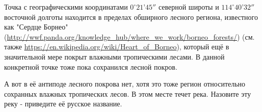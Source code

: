 
Точка с географическими координатами $0^{\circ}21’45''$ северной широты и $114^{\circ}40’32''$ 
восточной долготы находится в пределах обширного лесного региона, известного как "Сердце Борнео" (\url{http://wwf.panda.org/knowledge_hub/where_we_work/borneo_forests/})
 (см. также \url{https://en.wikipedia.org/wiki/Heart_of_Borneo}), который ещё в значительной мере покрыт влажными тропическими лесами. В данной конкретной точке тоже пока сохранился лесной покров.

А вот в её антиподе лесного покрова нет, хотя это тоже регион относительно сохранных влажных 
тропических лесов. В этом месте течет река. Назовите эту реку - приведите её русское название.

\solutionSection

